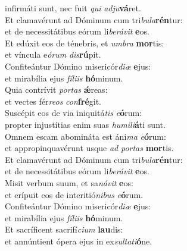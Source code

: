 \evenverse infirmáti sunt, nec fuit \textit{qui} \textit{ad}\textit{ju}\textbf{vá}ret.\\
\oddverse Et clamavérunt ad Dóminum cum tri\textit{bu}\textit{la}\textbf{rén}tur:~\*\\
\oddverse et de necessitátibus eórum li\textit{be}\textit{rá}\textit{vit} \textbf{e}os.\\
\evenverse Et edúxit eos de ténebris, et \textit{um}\textit{bra} \textbf{mor}tis:~\*\\
\evenverse et víncula e\textit{ó}\textit{rum} \textit{dis}\textbf{rú}pit.\\
\oddverse Confiteántur Dómino misericór\textit{di}\textit{æ} \textbf{e}jus:~\*\\
\oddverse et mirabília ejus \textit{fí}\textit{li}\textit{is} \textbf{hó}minum.\\
\evenverse Quia contrívit \textit{por}\textit{tas} \textbf{ǽ}reas:~\*\\
\evenverse et vectes fér\textit{re}\textit{os} \textit{con}\textbf{fré}git.\\
\oddverse Suscépit eos de via iniquitá\textit{tis} \textit{e}\textbf{ó}rum:~\*\\
\oddverse propter injustítias enim suas \textit{hu}\textit{mi}\textit{li}\textbf{á}ti sunt.\\
\evenverse Omnem escam abomináta est áni\textit{ma} \textit{e}\textbf{ó}rum:~\*\\
\evenverse et appropinquavérunt usque \textit{ad} \textit{por}\textit{tas} \textbf{mor}tis.\\
\oddverse Et clamavérunt ad Dóminum cum tri\textit{bu}\textit{la}\textbf{rén}tur:~\*\\
\oddverse et de necessitátibus eórum li\textit{be}\textit{rá}\textit{vit} \textbf{e}os.\\
\evenverse Misit verbum suum, et sa\textit{ná}\textit{vit} \textbf{e}os:~\*\\
\evenverse et erípuit eos de interitió\textit{ni}\textit{bus} \textit{e}\textbf{ó}rum.\\
\oddverse Confiteántur Dómino misericór\textit{di}\textit{æ} \textbf{e}jus:~\*\\
\oddverse et mirabília ejus \textit{fí}\textit{li}\textit{is} \textbf{hó}minum.\\
\evenverse Et sacríficent sacrifí\textit{ci}\textit{um} \textbf{lau}dis:~\*\\
\evenverse et annúntient ópera ejus in ex\textit{sul}\textit{ta}\textit{ti}\textbf{ó}ne.\\

